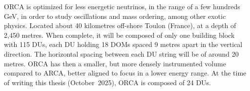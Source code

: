 ORCA is optimized for less energetic neutrinos, in the range of a few hundreds GeV, in order to study oscillations and mass ordering, among other exotic physics. Located about 40 kilometres off-shore Toulon (France), at a depth of 2,450 metres. When complete, it will be composed of only one building block with 115 DUs, each DU holding 18 DOMs spaced 9 metres apart in the vertical direction. The horizontal spacing between each DU string will be of around 20 metres. ORCA has then a smaller, but more densely instrumented volume compared to ARCA, better aligned to focus in a lower energy range. At the time of writing this thesis (October~2025), ORCA is composed of 24 DUs.


